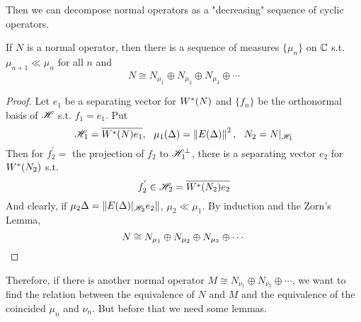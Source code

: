 \documentclass[a4paper,11pt]{report}
\begin{document}
Then we can decompose normal operators as a "decreasing" sequence of cyclic operators.

\begin{thm} \label{thm10}
	If $N$ is a normal operator, then there is a sequence of measures $\{\mu_n\}$ on $\mathbb{C}$ s.t. $\mu_{n+1} \ll \mu_{n}$ for all $n$ and 
	\begin{equation*}
		N \cong N_{\mu_1} \oplus N_{\mu_2} \oplus N_{\mu_3} \oplus \cdots
	\end{equation*}
\end{thm}
\begin{proof}
	Let $e_1$ be a separating vector for $W^{*}(N)$ and $\{f_n\}$ be the orthonormal basis of $\mathscr{H}$ s.t. $f_1 = e_1$. Put
	\begin{equation*}
		\mathscr{H}_1 = \overline{W^{*}(N)e_1},~~\mu_1(\Delta) = \left\lVert E(\Delta)\right\lVert^2,~~ N_2 = N|_{\mathscr{H}_1}
	\end{equation*}
	Then for $f_2^{'} = $ the projection of $f_2$ to $\mathscr{H}_1^{\bot}$, there is a separating vector $e_2$ for $W^{*}(N_2)$ s.t. 
	\begin{equation*}
		f_2^{'} \in \mathscr{H}_2 = \overline{W^{*}(N_2)e_2}
	\end{equation*} 
	And clearly, if $\mu_2{\Delta} = \left\lVert E(\Delta)|_{\mathscr{H}_2}e_2\right\lVert$, $\mu_2 \ll \mu_1$. By induction and the Zorn's Lemma, 
	\begin{equation*}
		N \cong N_{\mu_1} \oplus N_{\mu_2} \oplus N_{\mu_3} \oplus \cdots \qedhere
	\end{equation*}
\end{proof}

Therefore, if there is another normal operator $M \cong N_{\nu_1} \oplus N_{\nu_2} \oplus \cdots$, we want to find the relation between the equivalence of $N$ and $M$ and the equivalence of the coincided $\mu_n$ and $\nu_n$. But before that we need some lemmas.
\end{document}
